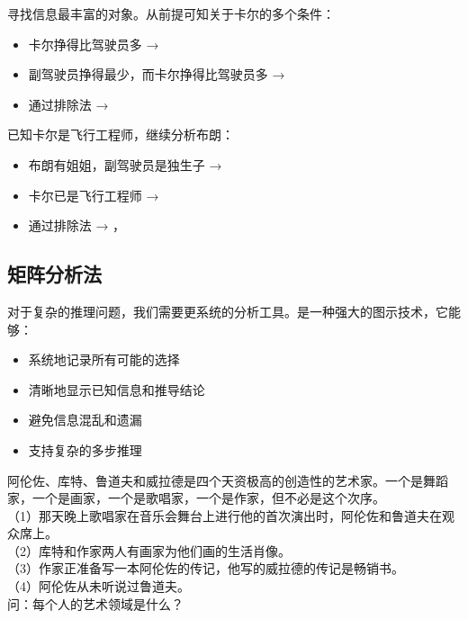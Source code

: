 \begin{theorembox}[title=解题策略：排除法推理]
寻找信息最丰富的对象。从前提可知关于卡尔的多个条件：
\begin{itemize}
  \item 卡尔挣得比驾驶员多 → 
  \item 副驾驶员挣得最少，而卡尔挣得比驾驶员多 → 
  \item 通过排除法 → 
\end{itemize}

已知卡尔是飞行工程师，继续分析布朗：
\begin{itemize}
  \item 布朗有姐姐，副驾驶员是独生子 → 
  \item 卡尔已是飞行工程师 → 
  \item 通过排除法 → ，
\end{itemize}
\end{theorembox}

\subsection{矩阵分析法}

对于复杂的推理问题，我们需要更系统的分析工具。是一种强大的图示技术，它能够：
\begin{itemize}
  \item 系统地记录所有可能的选择
  \item 清晰地显示已知信息和推导结论
  \item 避免信息混乱和遗漏
  \item 支持复杂的多步推理
\end{itemize}

\begin{examplebox}[title=四位艺术家身份识别问题]
\begin{displayquote}
阿伦佐、库特、鲁道夫和威拉德是四个天资极高的创造性的艺术家。一个是舞蹈家，一个是画家，一个是歌唱家，一个是作家，但不必是这个次序。\\
（1）那天晚上歌唱家在音乐会舞台上进行他的首次演出时，阿伦佐和鲁道夫在观众席上。\\
（2）库特和作家两人有画家为他们画的生活肖像。\\
（3）作家正准备写一本阿伦佐的传记，他写的威拉德的传记是畅销书。\\
（4）阿伦佐从未听说过鲁道夫。\\
问：每个人的艺术领域是什么？
\end{displayquote}
\end{examplebox}


